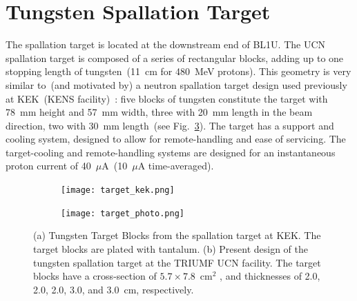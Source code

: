 \section{Tungsten Spallation Target\label{sec:target}}
The spallation target is located at the downstream end of BL1U. The
UCN spallation target is composed of a series of rectangular blocks,
adding up to one stopping length of tungsten~(11~cm for 480~MeV
protons). This geometry is very similar to~(and motivated by) a
neutron spallation target design used previously at KEK~(KENS
facility)~\cite{kawai2001fabrication}: five blocks of tungsten
constitute the target with 78~mm height and 57~mm width, three with
20~mm length in the beam direction, two with 30~mm length~(see
Fig.~\ref{fig:target}). The target has a support and cooling system,
designed to allow for remote-handling and ease of servicing. The
target-cooling and remote-handling systems are designed for an
instantaneous proton current of 40~$\mu$A~(10~$\mu$A time-averaged).

\begin{figure}[h!]
  \centering
  \begin{subfigure}{.5\textwidth}
    \centering
    \texttt{[image: target\_kek.png]}
    \caption{}
    \label{fig:target_kek}
  \end{subfigure}%
  \begin{subfigure}{.5\textwidth}
    \centering
    \texttt{[image: target\_photo.png]}
    \caption{}
    \label{fig:target_photo}
  \end{subfigure}
  \caption[TUCAN's spallation target]{(a) Tungsten Target Blocks from
    the spallation target at KEK. The target blocks are plated with
    tantalum. (b) Present design of the tungsten spallation target at
    the TRIUMF UCN facility. The target blocks have a cross-section of
    $5.7 \times 7.8$~cm$^2$ , and thicknesses of 2.0, 2.0, 2.0, 3.0,
    and 3.0~cm, respectively.}
  \label{fig:target}
\end{figure}

